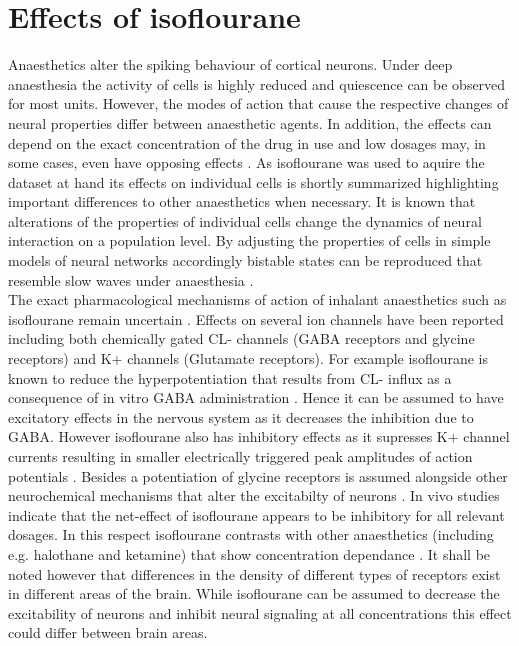 \section{Effects of isoflourane}
\label{effects_of_anaesthesia}
Anaesthetics alter the spiking behaviour of cortical neurons. Under deep anaesthesia the activity of cells is highly reduced and quiescence can be observed for most units. However, the modes of action that cause the respective changes of neural properties differ between anaesthetic agents. In addition, the effects can depend on the exact concentration of the drug in use and low dosages may, in some cases, even have opposing effects \parencite{moghadam2019comparative}. As isoflourane was used to aquire the dataset at hand its effects on individual cells is shortly summarized highlighting important differences to other anaesthetics when necessary. It is known that alterations of the properties of individual cells change the dynamics of neural interaction on a population level. By adjusting the properties of cells in simple models of neural networks accordingly bistable states can be reproduced that resemble slow waves under anaesthesia \parencite{jercog2017up}.\\
The exact pharmacological mechanisms of action of inhalant anaesthetics such as isoflourane remain uncertain \parencite{miller2020inhalational}. Effects on several ion channels have been reported including both chemically gated CL- channels (GABA receptors and glycine receptors) and K+ channels (Glutamate receptors). For example isoflourane is known to reduce the hyperpotentiation that results from CL- influx as a consequence of in vitro GABA administration \parencite{jenkins1999effects}. Hence it can be assumed to have excitatory effects in the nervous system as it decreases the inhibition due to GABA. However isoflourane also has inhibitory effects as it supresses K+ channel currents resulting in smaller electrically triggered peak amplitudes of action potentials \parencite{buljubasic1992effects}. Besides a potentiation of glycine receptors is assumed alongside other neurochemical mechanisms that alter the excitabilty of neurons \parencite{pubchem2020iso}. In vivo studies indicate that the net-effect of isoflourane appears to be inhibitory for all relevant dosages. In this respect isoflourane contrasts with other anaesthetics (including e.g. halothane and ketamine) that show concentration dependance \parencite{moghadam2019comparative}. It shall be noted however that differences in the density of different types of receptors exist in different areas of the brain. While isoflourane can be assumed to decrease the excitability of neurons and inhibit neural signaling at all concentrations this effect could differ between brain areas.\\
